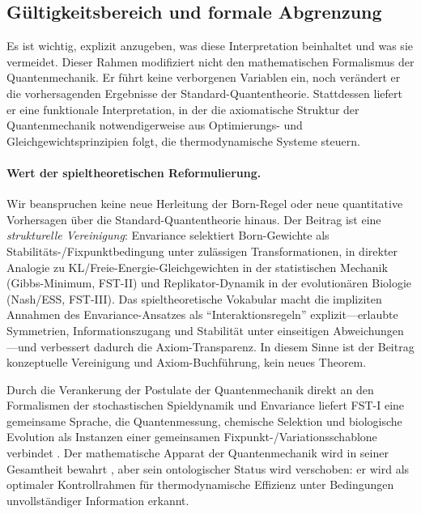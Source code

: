 \documentclass[12pt,a4paper]{article}
\theoremstyle{remark}
\begin{document}
\subsection{G\"ultigkeitsbereich und formale Abgrenzung}

Es ist wichtig, explizit anzugeben, was diese Interpretation beinhaltet und was sie vermeidet. Dieser Rahmen modifiziert nicht den mathematischen Formalismus der Quantenmechanik. Er f\"uhrt keine verborgenen Variablen ein, noch ver\"andert er die vorhersagenden Ergebnisse der Standard-Quantentheorie. Stattdessen liefert er eine funktionale Interpretation, in der die axiomatische Struktur der Quantenmechanik notwendigerweise aus Optimierungs- und Gleichgewichtsprinzipien folgt, die thermodynamische Systeme steuern.

\paragraph{Wert der spieltheoretischen Reformulierung.}
Wir beanspruchen keine neue Herleitung der Born-Regel oder neue quantitative Vorhersagen \"uber die Standard-Quantentheorie hinaus. Der Beitrag ist eine \emph{strukturelle Vereinigung}: Envariance selektiert Born-Gewichte als Stabilit\"ats-/Fixpunktbedingung unter zul\"assigen Transformationen, in direkter Analogie zu KL/Freie-Energie-Gleichgewichten in der statistischen Mechanik (Gibbs-Minimum, FST-II) und Replikator-Dynamik in der evolution\"aren Biologie (Nash/ESS, FST-III). Das spieltheoretische Vokabular macht die impliziten Annahmen des Envariance-Ansatzes als ``Interaktionsregeln'' explizit---erlaubte Symmetrien, Informationszugang und Stabilit\"at unter einseitigen Abweichungen---und verbessert dadurch die Axiom-Transparenz. In diesem Sinne ist der Beitrag konzeptuelle Vereinigung und Axiom-Buchf\"uhrung, kein neues Theorem.

Durch die Verankerung der Postulate der Quantenmechanik direkt an den Formalismen der stochastischen Spieldynamik und Envariance liefert FST-I eine gemeinsame Sprache, die Quantenmessung, chemische Selektion und biologische Evolution als Instanzen einer gemeinsamen Fixpunkt-/Variationsschablone verbindet \citep{ZurekDerivation2003}. Der mathematische Apparat der Quantenmechanik wird in seiner Gesamtheit bewahrt \citep{QuantumOptimization}, aber sein ontologischer Status wird verschoben: er wird als optimaler Kontrollrahmen f\"ur thermodynamische Effizienz unter Bedingungen unvollst\"andiger Information erkannt.

\end{document}
